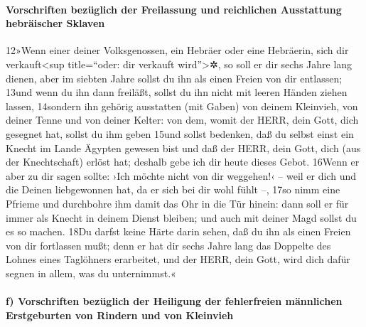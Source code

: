 \hypertarget{vorschriften-bezuxfcglich-der-freilassung-und-reichlichen-ausstattung-hebruxe4ischer-sklaven}{%
\paragraph{Vorschriften bezüglich der Freilassung und reichlichen
Ausstattung hebräischer
Sklaven}\label{vorschriften-bezuxfcglich-der-freilassung-und-reichlichen-ausstattung-hebruxe4ischer-sklaven}}

12»Wenn einer deiner Volksgenossen, ein Hebräer oder eine Hebräerin,
sich dir verkauft\textless sup title=``oder: dir verkauft
wird''\textgreater✲, so soll er dir sechs Jahre lang dienen, aber im
siebten Jahre sollst du ihn als einen Freien von dir entlassen; 13und
wenn du ihn dann freiläßt, sollst du ihn nicht mit leeren Händen ziehen
lassen, 14sondern ihn gehörig ausstatten (mit Gaben) von deinem
Kleinvieh, von deiner Tenne und von deiner Kelter: von dem, womit der
HERR, dein Gott, dich gesegnet hat, sollst du ihm geben 15und sollst
bedenken, daß du selbst einst ein Knecht im Lande Ägypten gewesen bist
und daß der HERR, dein Gott, dich (aus der Knechtschaft) erlöst hat;
deshalb gebe ich dir heute dieses Gebot. 16Wenn er aber zu dir sagen
sollte: ›Ich möchte nicht von dir weggehen!‹ -- weil er dich und die
Deinen liebgewonnen hat, da er sich bei dir wohl fühlt --, 17so nimm
eine Pfrieme und durchbohre ihm damit das Ohr in die Tür hinein: dann
soll er für immer als Knecht in deinem Dienst bleiben; und auch mit
deiner Magd sollst du es so machen. 18Du darfst keine Härte darin sehen,
daß du ihn als einen Freien von dir fortlassen mußt; denn er hat dir
sechs Jahre lang das Doppelte des Lohnes eines Taglöhners erarbeitet,
und der HERR, dein Gott, wird dich dafür segnen in allem, was du
unternimmst.«

\hypertarget{f-vorschriften-bezuxfcglich-der-heiligung-der-fehlerfreien-muxe4nnlichen-erstgeburten-von-rindern-und-von-kleinvieh}{%
\paragraph{f) Vorschriften bezüglich der Heiligung der fehlerfreien
männlichen Erstgeburten von Rindern und von
Kleinvieh}\label{f-vorschriften-bezuxfcglich-der-heiligung-der-fehlerfreien-muxe4nnlichen-erstgeburten-von-rindern-und-von-kleinvieh}}


